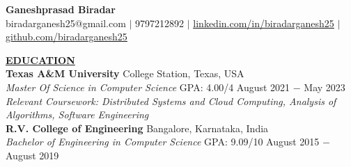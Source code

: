 \documentclass{article}
\begin{document}
\begin{center}
\large \textbf{Ganeshprasad Biradar \\}
\normalsize biradarganesh25@gmail.com $\mid$ 9797212892 $\mid$ \href{https://www.linkedin.com/in/biradarganesh25}{\underline{linkedin.com/in/biradarganesh25}} $\mid$ \href{https://github.com/biradarganesh25}{\underline{github.com/biradarganesh25}} \\
\hrulefill
\end{center}





\noindent \textbf{\underline{EDUCATION}} \\
\textbf{Texas A\&M University} \hfill College Station, Texas, USA \\
\textit{Master Of Science in Computer Science}  \tabto*{9cm} GPA: 4.00/4 \hfill August 2021 $-$ May 2023 \\
\textit{Relevant Coursework: Distributed Systems and Cloud Computing, Analysis of Algorithms, Software Engineering}\\

\noindent \textbf{R.V. College of Engineering} \hfill Bangalore, Karnataka, India \\
\textit{Bachelor of Engineering in Computer Science} \tabto*{9cm} GPA: 9.09/10 \hfill August 2015 $-$ August 2019 \\
\end{document}
